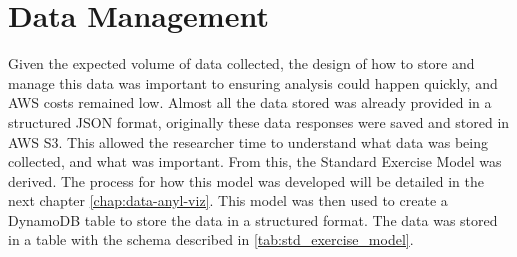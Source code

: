 \section{\label{sec:data-mgmt}Data Management}
Given the expected volume of data collected, the design of how to store and manage this data was important to ensuring analysis could happen quickly, and AWS costs remained low. Almost all the data stored was already provided in a structured JSON format, originally these data responses were saved and stored in AWS S3. This allowed the researcher time to understand what data was being collected, and what was important. From this, the Standard Exercise Model was derived. The process for how this model was developed will be detailed in the next chapter \ref{chap:data-anyl-viz}. This model was then used to create a DynamoDB table to store the data in a structured format. The data was stored in a table with the schema described in \autoref{tab:std_exercise_model}.
\begin{table}[h]
  \centering
  \caption[Standard Exercise Model Schema]{\label{tab:std_exercise_model}The schema for the "Standard Exercise Model"}
\end{table}

